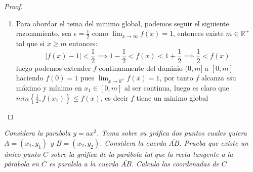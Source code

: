 \documentclass[11pt,letterpaper]{article}
\newcommand{\R}{\mathbb{R}}
\begin{document}
\begin{proof}
\begin{enumerate}
        ahora demostraremos que $f(x)\leq 1$ para todo $x\in(0,1]$, para ello primero notemos que en el intervalo $(0,y_1]$ la funci\'on es estrictamente decreciente pues no puede habe otro punto crictio entre $0$ y $y_1$, por tanto en este intervalo la funci\'on estara claramente acotada por $1$ pues $\displaystyle\lim_{x \to 0^{+}}=1$, luego tenemos que si existiera un punto $z\in(y_2,1]$ tal que $f(z)>1$, claramente $y_1<z<1<y_2$, luego como $f(y_2)<1$ y $f(z)>1$ por teorema del valor medio
        existe $d\in(y_2,z)$ tal que $f(d)=1$, ahora $f$ cumple las hipotesis del teorema de Rolle en el intervalo $[d,1]$, por tanto existiria $y_2<d<y_3<1<y_2$ con $y_3$ punto crictico, una contradicci\'on pues $f$ tiene solo tres puntos criticos, por tanto $f(x)\leq 1$ para todo $x\in(0,1]$
        ahora para demostrar que $f(x)\leq 1$ para todo $x\in[1,\infty)$, notemos que $f(x)=f\left(\frac{1}{x}\right)$, por tanto si $x>1\implies \frac{1}{x}<1$, por tanto $f(x)=f\left(\frac{1}{x}\right)<1$, por tanto $x=1$ no es solo un m\'aximo local sino global.
        \item Para abordar el tema del minimo global, podemos seguir el siguiente razonamiento, sea $\epsilon=\frac{1}{2}$ como $\displaystyle\lim_{x\to \infty}f(x)=1$, entonces existe $m\in \R^{+}$ tal que si $x\geq m$ entonces:\,\\
        \begin{equation*}
            |f(x)-1|< \frac{1}{2}\implies1-\frac{1}{2}<f(x)<1+\frac{1}{2}\implies \frac{1}{2}< f(x)
        \end{equation*}
        luego podemos extender $f$ continuamente del dominio $(0,m]$ a $[0,m]$ haciendo $f(0)=1$ pues $\displaystyle \lim_{x\to0^+}f(x)=1$, por tanto $f$ alcanza ssu m\'aximo y m\'inimo en $x_1\in[0,m]$ al ser continua, luego es claro que $min\left\{\frac{1}{2},f(x_1)\right\}\leq f(x)$, es decir $f$ tiene un minimo global
    \end{enumerate}
    \end{proof}
    \newpage
    \begin{tcolorbox}[
	title = \textcolor{black}{\textcolor{white}{Problema 2 (Parte 1)}},]
\textit{Considera la parabola $y=ax^2$. Toma sobre su gr\'afica dos puntos  cuales quiera $A=(x_1,y_1)$ y $B=(x_2,y_2)$. Considera la cuerda $\overline{AB}$. Prueba que existe 
un \'unico punto $C$ sobre la gr\'afica de la par\'abola tal que la recta tangente a la p\'arabola en $C$ es paralela a la cuerda $\overline{AB}$. Calcula las coordenadas de $C$  }
\end{tcolorbox}
\end{document}
